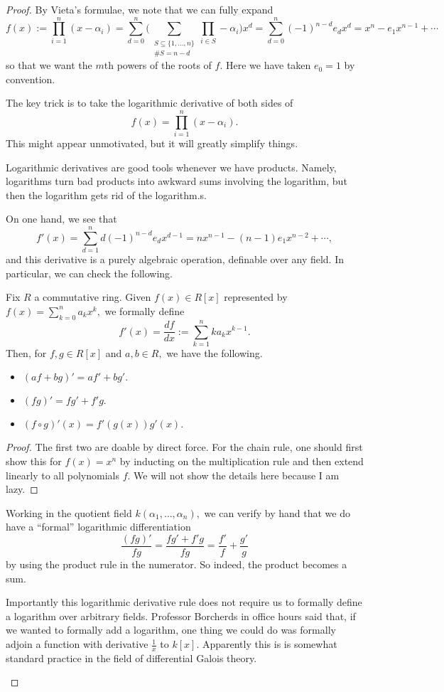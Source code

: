 \documentclass[../notes.tex]{subfiles}
\begin{document}
\begin{proof}
	By Vieta's formulae, we note that we can fully expand
	\[f(x):=\prod_{i=1}^n(x-\alpha_i)=\sum_{d=0}^n\bigg(\sum_{\substack{S\subseteq\{1,\ldots,n\}\\\#S=n-d}}\prod_{i\in S}-\alpha_i\bigg)x^d=\sum_{d=0}^n(-1)^{n-d}e_dx^d=x^n-e_1x^{n-1}+\cdots\]
	so that we want the $m$th powers of the roots of $f.$ Here we have taken $e_0=1$ by convention.
	
	The key trick is to take the logarithmic derivative of both sides of
	\[f(x)=\prod_{i=1}^n(x-\alpha_i).\]
	This might appear unmotivated, but it will greatly simplify things.
	\begin{remark}
		Logarithmic derivatives are good tools whenever we have products. Namely, logarithms turn bad products into awkward sums involving the logarithm, but then the logarithm gets rid of the logarithm.s.
	\end{remark}
	On one hand, we see that
	\[f'(x)=\sum_{d=1}^nd(-1)^{n-d}e_dx^{d-1}=nx^{n-1}-(n-1)e_1x^{n-2}+\cdots,\]
	and this derivative is a purely algebraic operation, definable over any field. In particular, we can check the following.
	\begin{proposition}
		Fix $R$ a commutative ring. Given $f(x)\in R[x]$ represented by $f(x)=\sum_{k=0}^na_kx^k,$ we formally define
		\[f'(x)=\frac{df}{dx}:=\sum_{k=1}^nka_kx^{k-1}.\]
		Then, for $f,g\in R[x]$ and $a,b\in R,$ we have the following.
		\begin{itemize}
			\item $(af+bg)'=af'+bg'.$
			\item $(fg)'=fg'+f'g.$
			\item $(f\circ g)'(x)=f'(g(x))g'(x).$
		\end{itemize}
	\end{proposition}
	\begin{proof}
		The first two are doable by direct force. For the chain rule, one should first show this for $f(x)=x^n$ by inducting on the multiplication rule and then extend linearly to all polynomials $f.$ We will not show the details here because I am lazy.
	\end{proof}
	Working in the quotient field $k(\alpha_1,\ldots,\alpha_n),$ we can verify by hand that we do have a ``formal'' logarithmic differentiation
	\[\frac{(fg)'}{fg}=\frac{fg'+f'g}{fg}=\frac{f'}f+\frac{g'}g\]
	by using the product rule in the numerator. So indeed, the product becomes a sum.
	\begin{remark}
		Importantly this logarithmic derivative rule does not require us to formally define a logarithm over arbitrary fields. Professor Borcherds in office hours said that, if we wanted to formally add a logarithm, one thing we could do was formally adjoin a function with derivative $\frac1x$ to $k[x].$ Apparently this is is somewhat standard practice in the field of differential Galois theory.

\end{remark}
\end{proof}
\end{document}
